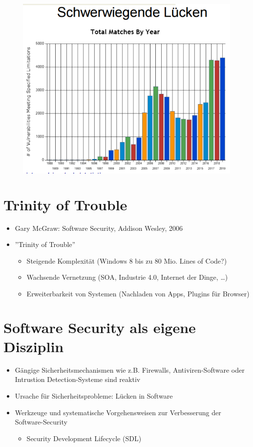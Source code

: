 \documentclass[openany]{book}
\begin{document}
\newpage

\begin{figure}[h!]
    \centering
    \includegraphics[width=0.85\linewidth]{Pics/SoftwareBackdoors.PNG}
\end{figure}

\section{Trinity of Trouble}

\begin{itemize}
    \item Gary McGraw: Software Security, Addison Wesley, 2006
    \item ''Trinity of Trouble''
    \begin{itemize}
        \item Steigende Komplexität (Windows 8 bis zu 80 Mio. Lines of Code?)
        \item Wachsende Vernetzung (SOA, Industrie 4.0, Internet der Dinge, \dots)
        \item Erweiterbarkeit von Systemen (Nachladen von Apps, Plugins für Browser)
    \end{itemize} 
\end{itemize}

\section{Software Security als eigene Disziplin}

\begin{itemize}
    \item Gängige Sicherheitsmechanismen wie z.B. Firewalls, Antiviren-Software oder Intrustion Detection-Systeme sind reaktiv
    \item Ursache für Sicherheitsprobleme: Lücken in Software
    \item Werkzeuge und systematische Vorgehensweisen zur Verbesserung der Software-Security
    \begin{itemize}
        \item Security Development Lifecycle (SDL)
    \end{itemize}
\end{itemize}
\end{document}
